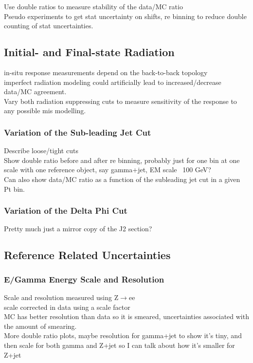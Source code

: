 Use double ratios to measure stability of the data/MC ratio \\
Pseudo experiments to get stat uncertainty on shifts, re binning to reduce double counting of stat uncertainties.  

\subsection{Initial- and Final-state Radiation}
in-situ response measurements depend on the back-to-back topology \\
imperfect radiation modeling could artificially lead to increased/decrease data/MC agreement. \\
Vary both radiation suppressing cuts to measure sensitivity of the response to any possible mis modelling. \\
\subsubsection{Variation of the Sub-leading Jet Cut}
Describe loose/tight cuts\\
Show double ratio before and after re binning, probably just for one bin at one scale with one reference object, say gamma+jet, EM scale ~100 GeV? \\
Can also show data/MC ratio as a function of the subleading jet cut in a given Pt bin. \\
\subsubsection{Variation of the Delta Phi Cut}
Pretty much just a mirror copy of the J2 section?

\subsection{Reference Related Uncertainties}

\subsubsection{E/Gamma Energy Scale and Resolution}

Scale and resolution measured using Z$\rightarrow$ee~\cite{ATL-PHYS-PUB-2016-015}\\
scale corrected in data using a scale factor \\
MC has better resolution than data so it is smeared, uncertainties associated with the amount of smearing. \\
More double ratio plots, maybe resolution for gamma+jet to show it's tiny, and then scale for both gamma and Z+jet so I can talk about how it's smaller for Z+jet

